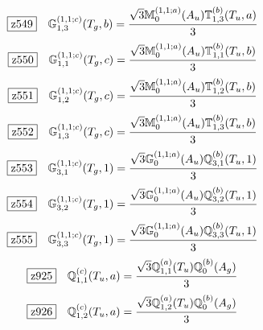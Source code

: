 \documentclass[fleqn,10pt,landscape]{jsarticle}
\begin{document}
\begin{dmath*}
\hspace*{3mm}\fbox{z549}\quad \mathbb{G}_{1,3}^{(1,1;c)}(T_{g},b)=\frac{\sqrt{3} \mathbb{M}_{0}^{(1,1;a)}(A_{u}) \mathbb{T}_{1,3}^{(b)}(T_{u},a)}{3}
\end{dmath*}
\begin{dmath*}
\hspace*{3mm}\fbox{z550}\quad \mathbb{G}_{1,1}^{(1,1;c)}(T_{g},c)=\frac{\sqrt{3} \mathbb{M}_{0}^{(1,1;a)}(A_{u}) \mathbb{T}_{1,1}^{(b)}(T_{u},b)}{3}
\end{dmath*}
\begin{dmath*}
\hspace*{3mm}\fbox{z551}\quad \mathbb{G}_{1,2}^{(1,1;c)}(T_{g},c)=\frac{\sqrt{3} \mathbb{M}_{0}^{(1,1;a)}(A_{u}) \mathbb{T}_{1,2}^{(b)}(T_{u},b)}{3}
\end{dmath*}
\begin{dmath*}
\hspace*{3mm}\fbox{z552}\quad \mathbb{G}_{1,3}^{(1,1;c)}(T_{g},c)=\frac{\sqrt{3} \mathbb{M}_{0}^{(1,1;a)}(A_{u}) \mathbb{T}_{1,3}^{(b)}(T_{u},b)}{3}
\end{dmath*}
\begin{dmath*}
\hspace*{3mm}\fbox{z553}\quad \mathbb{G}_{3,1}^{(1,1;c)}(T_{g},1)=\frac{\sqrt{3} \mathbb{G}_{0}^{(1,1;a)}(A_{u}) \mathbb{Q}_{3,1}^{(b)}(T_{u},1)}{3}
\end{dmath*}
\begin{dmath*}
\hspace*{3mm}\fbox{z554}\quad \mathbb{G}_{3,2}^{(1,1;c)}(T_{g},1)=\frac{\sqrt{3} \mathbb{G}_{0}^{(1,1;a)}(A_{u}) \mathbb{Q}_{3,2}^{(b)}(T_{u},1)}{3}
\end{dmath*}
\begin{dmath*}
\hspace*{3mm}\fbox{z555}\quad \mathbb{G}_{3,3}^{(1,1;c)}(T_{g},1)=\frac{\sqrt{3} \mathbb{G}_{0}^{(1,1;a)}(A_{u}) \mathbb{Q}_{3,3}^{(b)}(T_{u},1)}{3}
\end{dmath*}
\begin{dmath*}
\hspace*{3mm}\fbox{z925}\quad \mathbb{Q}_{1,1}^{(c)}(T_{u},a)=\frac{\sqrt{3} \mathbb{Q}_{1,1}^{(a)}(T_{u}) \mathbb{Q}_{0}^{(b)}(A_{g})}{3}
\end{dmath*}
\begin{dmath*}
\hspace*{3mm}\fbox{z926}\quad \mathbb{Q}_{1,2}^{(c)}(T_{u},a)=\frac{\sqrt{3} \mathbb{Q}_{1,2}^{(a)}(T_{u}) \mathbb{Q}_{0}^{(b)}(A_{g})}{3}
\end{dmath*}
\end{document}
